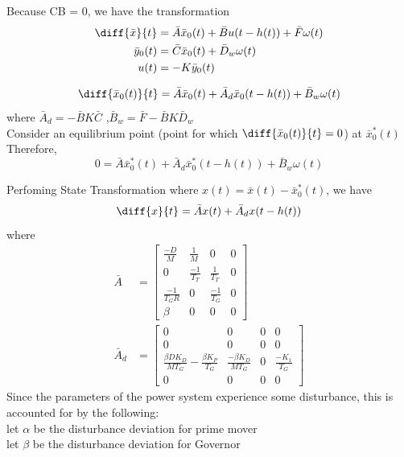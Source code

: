 \documentclass[journal]{IEEEtran}
\begin{document}
Because CB = 0, we have the transformation
\begin{align}
  \diff{\bar{x}}{t} &= \bar{A}\bar{x}_0(t) + \bar{B}u(t-h(t)) + \bar{F}\omega (t) \\
  \bar{y}_0(t) &= \bar{C}\bar{x}_0(t) + \bar{D}_w\omega(t) \\
  u(t)&= -K\bar{y}_0(t)
\end{align}

\begin{align}
  \diff{\bar{x}_{0}(t)}{t} = \bar{A}\bar{x}_{0}(t) + \bar{A}_{d}\bar{x}_{0}(t-h(t)) + \bar{B}_w\omega(t) \\
\end{align}
where $\bar{A}_{d}= -\bar{B}K\bar{C}$ ,$\bar{B}_w = \bar{F} - \bar{B}K\bar{D}_w $\\

Consider an equilibrium point (point for which $\diff{\bar{x}_0(t)}{t} = 0$) at $\bar{x}_0^*(t)$
Therefore,           
\begin{equation}
  0 = \bar{A}\bar{x}_0^*(t) + \bar{A}_d\bar{x}_0^*(t-h(t)) + \bar{B}_w\omega(t)
\end{equation}

Perfoming State Transformation where $x(t) = \bar{x}(t)-\bar{x}_0^*(t)$, we have
\begin{equation}
  \diff{x}{t} = \bar{A}x(t) + \bar{A}_dx(t-h(t)) \\
\end{equation}
where 
\begin{align}
  \bar{A} &=
  \begin{bmatrix}
    \frac{-D}{M} & \frac{1}{M} & 0 & 0 \\
    0 & \frac{-1}{T_T} & \frac{1}{T_T} & 0 \\
    \frac{-1}{T_GR} & 0& \frac{-1}{T_G} & 0 \\
    \beta & 0 & 0 & 0
  \end{bmatrix} \\
  \bar{A}_d &=
  \begin{bmatrix}
    0 & 0 & 0 & 0 \\
    0 & 0 & 0 & 0 \\
    \frac{\beta D K_D}{MT_G} - \frac{\beta K_{P}}{T_G} & \frac{-\beta K_D}{MT_G} & 0 & \frac{-K_1}{T_G} \\
    0 & 0 & 0 & 0
  \end{bmatrix}
\end{align}
Since the parameters of the power system experience some disturbance, this is accounted for by the following: \\
 let $\alpha$ be the disturbance deviation for prime mover \\
 let $\beta$ be the disturbance deviation for Governor \\
 
\end{document}

